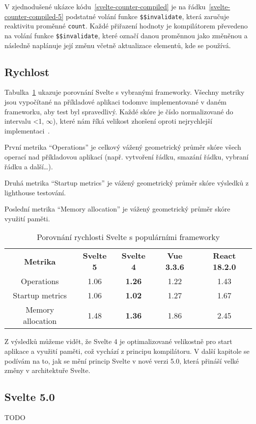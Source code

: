 V zjednodušené ukázce kódu~\ref{svelte-counter-compiled} je na řádku~\ref{svelte-counter-compiled-5} podstatné volání funkce \texttt{\$\$invalidate}, která zaručuje reaktivitu proměnné \texttt{count}.
Každé přiřazení hodnoty je kompilátorem převedeno na volání funkce \texttt{\$\$invalidate}, které označí danou proměnnou jako změněnou a následně naplánuje její změnu včetně aktualizace elementů, kde se používá.

\subsection{Rychlost}

Tabulka~\ref{tab:foobar} ukazuje porovnání Svelte s vybranými frameworky.
Všechny metriky jsou vypočítané na příkladové aplikaci \gls{todomvc} implementované v daném frameworku, aby test byl spravedlivý.
Každé skóre je číslo normalizované do intervalu <1, $\infty$), které nám říká velikost zhoršení oproti nejrychlejší implementaci~\cite{krausest119,krausest120}.

První metrika ``Operations'' je celkový vážený geometrický průměr skóre všech operací nad příkladovou aplikací (např. vytvoření řádku, smazání řádku, vybraní řádku a další\dots).

Druhá metrika ``Startup metrics'' je vážený geometrický průměr skóre výsledků z \gls{lighthouse} testování.

Poslední metrika ``Memory allocation'' je vážený geometrický průměr skóre využití paměti.


\begin{table}[ht]
    \begin{tabular}{c|c|c|c|c}
        \bfseries Metrika & \bfseries{Svelte 5} & \bfseries{Svelte 4} & \bfseries{Vue 3.3.6} & \bfseries{React 18.2.0} \\\Midrule{}
        Operations        & 1.06                & \textbf{1.26}       & 1.22                 & 1.43                    \\
        Startup metrics   & 1.06                & \textbf{1.02}       & 1.27                 & 1.67                    \\
        Memory allocation & 1.48                & \textbf{1.36}       & 1.86                 & 2.45
    \end{tabular}
    \caption{Porovnání rychlosti Svelte s populárními frameworky}
    \label{tab:foobar}
\end{table}

Z výsledků můžeme vidět, že Svelte 4 je optimalizované velikostně pro start aplikace a využití paměti, což vychází z principu kompilátoru.
V další kapitole se podívám na to, jak se mění princip Svelte v nové verzi 5.0, která přináší velké změny v architektuře Svelte.

\subsection{Svelte 5.0}

TODO
